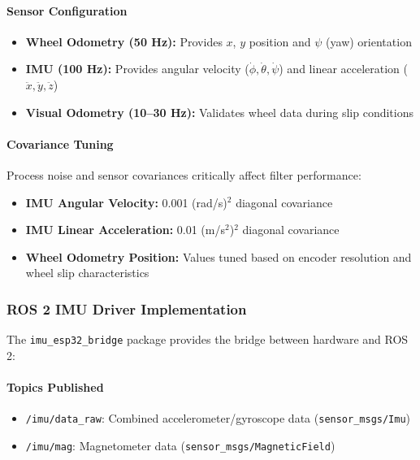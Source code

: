 \paragraph{Sensor Configuration}
\begin{itemize}
    \item \textbf{Wheel Odometry (50 Hz):} Provides $x$, $y$ position and $\psi$ (yaw) orientation
    \item \textbf{IMU (100 Hz):} Provides angular velocity ($\dot{\phi}, \dot{\theta}, \dot{\psi}$) and linear acceleration ($\ddot{x}, \ddot{y}, \ddot{z}$)
    \item \textbf{Visual Odometry (10--30 Hz):} Validates wheel data during slip conditions
\end{itemize}

\paragraph{Covariance Tuning}
Process noise and sensor covariances critically affect filter performance:
\begin{itemize}
    \item \textbf{IMU Angular Velocity:} 0.001 (rad/s)$^2$ diagonal covariance
    \item \textbf{IMU Linear Acceleration:} 0.01 (m/s$^2$)$^2$ diagonal covariance
    \item \textbf{Wheel Odometry Position:} Values tuned based on encoder resolution and wheel slip characteristics
\end{itemize}

\subsubsection{ROS 2 IMU Driver Implementation}

The \texttt{imu\_esp32\_bridge} package provides the bridge between hardware and ROS 2:

\paragraph{Topics Published}
\begin{itemize}
    \item \texttt{/imu/data\_raw}: Combined accelerometer/gyroscope data (\texttt{sensor\_msgs/Imu})
    \item \texttt{/imu/mag}: Magnetometer data (\texttt{sensor\_msgs/MagneticField})
\end{itemize}

